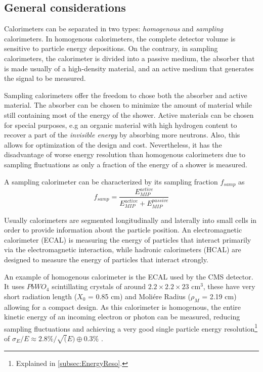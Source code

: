 \subsection{General considerations}

Calorimeters can be separated in two types: \textit{homogenous} and \textit{sampling} calorimeters. In homogenous calorimeters, the complete detector volume is sensitive to particle energy depositions. On the contrary, in sampling calorimeters, the calorimeter is divided into a passive medium, the absorber that is made usually of a high-density material, and an active medium that generates the signal to be measured.

Sampling calorimeters offer the freedom to chose both the absorber and active material. The absorber can be chosen to minimize the amount of material while still containing most of the energy of the shower. Active materials can be chosen for special purposes, e.g an organic material with high hydrogen content to recover a part of the \textit{invisible energy} by absorbing more neutrons. Also, this allows for optimization of the design and cost. Nevertheless, it has the disadvantage of worse energy resolution than homogenous calorimeters due to sampling fluctuations as only a fraction of the energy of a shower is measured.

A sampling calorimeter can be characterized by its sampling fraction $f_{samp}$ as
\begin{equation}
  f_{samp} = \frac{E_{MIP}^{active}}{E_{MIP}^{active} + E_{MIP}^{passive}}
\end{equation}

Usually calorimeters are segmented longitudinally and laterally into small cells in order to provide information about the particle position. An electromagnetic calorimeter (ECAL) is measuring the energy of particles that interact primarily via the electromagnetic interaction, while hadronic calorimeters (HCAL) are designed to measure the energy of particles that interact strongly.

An example of homogenous calorimeter is the ECAL used by the CMS detector. It uses $PbWO_4$ scintillating crystals of around $2.2 \times 2.2 \times 23$ cm$^3$, these have very short radiation length ($X_0$ = 0.85 cm) and Moli\'ere Radius ($\rho_M$ = 2.19 cm) allowing for a compact design. As this calorimeter is homogenous, the entire kinetic energy of an incoming electron or photon can be measured, reducing sampling fluctuations and achieving a very good single particle energy resolution\footnote{Explained in \ref{subsec:EnergyReso}.} of $\sigma_E/E \approx 2.8\%/\sqrt(E) \oplus 0.3\%$ \cite{1742-6596-587-1-012001}.

